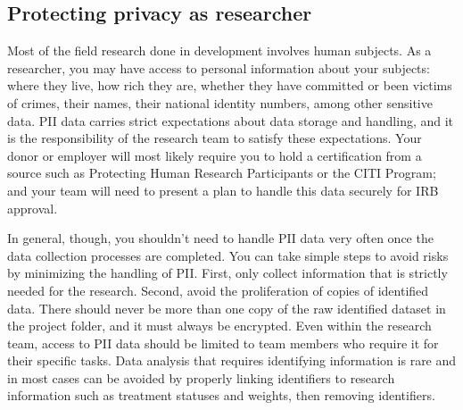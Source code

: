 \subsection{Protecting privacy as researcher}

Most of the field research done in development involves human subjects.
As a researcher, you may have access to personal information about your subjects:
where they live, how rich they are, whether they have committed or been victims of crimes,
their names, their national identity numbers, among other sensitive data.
PII data carries strict expectations about data storage and handling,
and it is the responsibility of the research team to satisfy these expectations.
Your donor or employer will most likely require you to hold a certification from a source
such as Protecting Human Research Participants
or the CITI Program;
and your team will need to present a plan to handle this data securely for IRB approval.

In general, though, you shouldn't need to handle PII data very often
once the data collection processes are completed.
You can take simple steps to avoid risks by minimizing the handling of PII.
First, only collect information that is strictly needed for the research.
Second, avoid the proliferation of copies of identified data.
There should never be more than one copy of the raw identified dataset in the project folder,
and it must always be encrypted.
Even within the research team,
access to PII data should be limited to team members who require it for their specific tasks.
Data analysis that requires identifying information is rare
and in most cases can be avoided by properly linking identifiers to research information
such as treatment statuses and weights, then removing identifiers.

